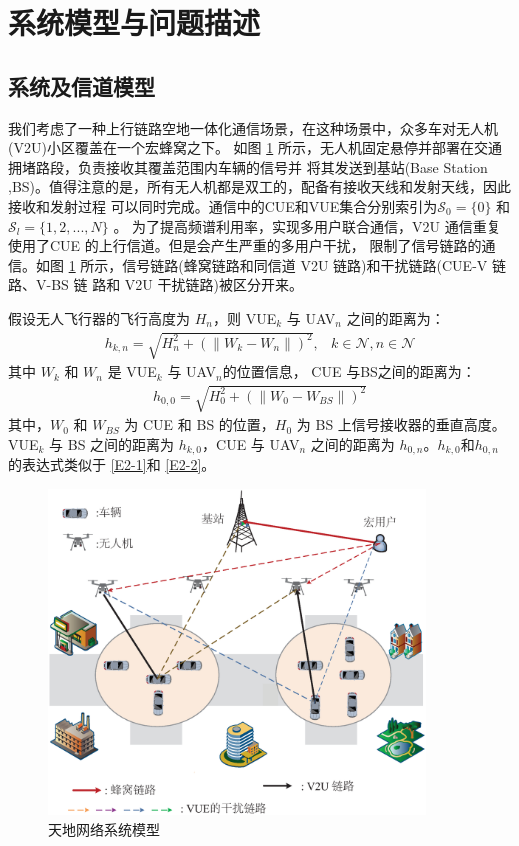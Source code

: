 \section{系统模型与问题描述}\label{section2-2}
\subsection{系统及信道模型}\label{section2-2-1}
我们考虑了一种上行链路空地一体化通信场景，在这种场景中，众多车对无人机(V2U)小区覆盖在一个宏蜂窝之下。
如图 \ref{天地网络系统模型} 所示，无人机固定悬停并部署在交通拥堵路段，负责接收其覆盖范围内车辆的信号并
将其发送到基站(Base Station ,BS)。值得注意的是，所有无人机都是双工的，配备有接收天线和发射天线，因此接收和发射过程
可以同时完成。通信中的CUE和VUE集合分别索引为$\mathcal{S}_0= \{0\}$ 和$\mathcal{S}_l=\{1, 2,..., N\}$ 。
为了提高频谱利用率，实现多用户联合通信，V2U 通信重复使用了CUE 的上行信道。但是会产生严重的多用户干扰，
限制了信号链路的通信。如图 \ref{天地网络系统模型} 所示，信号链路(蜂窝链路和同信道 V2U 链路)和干扰链路(CUE-V 链路、V-BS 链
路和 V2U 干扰链路)被区分开来。

假设无人飞行器的飞行高度为 $H_n$，则 VUE$_{k}$ 与 UAV$_{n}$ 之间的距离为：
\begin{eqnarray}\label{E2-1}
h_{k,n}=\sqrt{H_n^2+(\|W_k-W_n\|)^2},           &k\in \mathcal{N}, n\in \mathcal{N}
\end{eqnarray}
其中 $W_k$ 和 $W_n$ 是 VUE$_{k}$ 与 UAV$_{n}$的位置信息，  CUE 与BS之间的距离为：
\begin{eqnarray}\label{E2-2}
h_{0,0}=\sqrt{H_0^2+(\|W_0-W_{BS}\|)^2}
\end{eqnarray}
其中，$W_0$ 和 $W_{BS}$ 为 CUE 和 BS 的位置，$H_0$ 为 BS 上信号接收器的垂直高度。VUE$_{k}$ 与 BS 之间的距离为 $h_{k,0}$，CUE 与 UAV$_{n}$ 之间的距离为 $h_{0,n}$。$h_{k,0}$和$h_{0,n}$的表达式类似于 \eqref{E2-1}和 \eqref{E2-2}。

\begin{figure}[H]
\centering
\includegraphics[width=10cm]{figures//chap2//第二章系统模型.eps}
\caption{天地网络系统模型}
\label{天地网络系统模型}
\end{figure}

